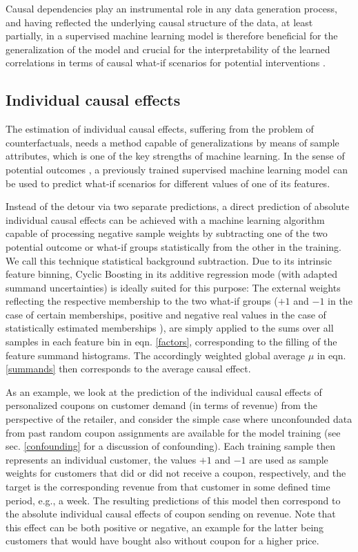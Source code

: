 \documentclass[BCOR=1mm, DIV=calc,10pt,
twoside=true,
twocolumn,
headings=normal]{scrartcl}
\begin{document}
Causal dependencies play an instrumental role in any data generation process, and having reflected the underlying causal structure of the data, at least partially, in a supervised machine learning model is therefore beneficial for the generalization of the model and crucial for the interpretability of the learned correlations in terms of causal what-if scenarios for potential interventions \cite{PearlCausality,PearlML}.

\subsection{Individual causal effects}
\label{causalinf}

The estimation of individual causal effects, suffering from the problem of counterfactuals, needs a method capable of generalizations by means of sample attributes, which is one of the key strengths of machine learning. In the sense of potential outcomes \cite{Rubin}, a previously trained supervised machine learning model can be used to predict what-if scenarios for different values of one of its features.

Instead of the detour via two separate predictions, a direct prediction of absolute individual causal effects can be achieved with a machine learning algorithm capable of processing negative sample weights by subtracting one of the two potential outcome or what-if groups statistically from the other in the training. We call this technique statistical background subtraction. Due to its intrinsic feature binning, Cyclic Boosting in its additive regression mode (with adapted summand uncertainties) is ideally suited for this purpose: The external weights reflecting the respective membership to the two what-if groups ($+1$ and $-1$ in the case of certain memberships, positive and negative real values in the case of statistically estimated memberships \cite{Pivk_2005,PhysRevD.84.012003,PhysRevD.86.032007}), are simply applied to the sums over all samples in each feature bin in eqn. \ref{factors}, corresponding to the filling of the feature summand histograms. The accordingly weighted global average $\mu$ in eqn. \ref{summands} then corresponds to the average causal effect.

As an example, we look at the prediction of the individual causal effects of personalized coupons on customer demand (in terms of revenue) from the perspective of the retailer, and consider the simple case where unconfounded data from past random coupon assignments are available for the model training (see sec. \ref{confounding} for a discussion of confounding). Each training sample then represents an individual customer, the values $+1$ and $-1$ are used as sample weights for customers that did or did not receive a coupon, respectively, and the target is the corresponding revenue from that customer in some defined time period, e.g., a week. The resulting predictions of this model then correspond to the absolute individual causal effects of coupon sending on revenue. Note that this effect can be both positive or negative, an example for the latter being customers that would have bought also without coupon for a higher price.
\end{document}
